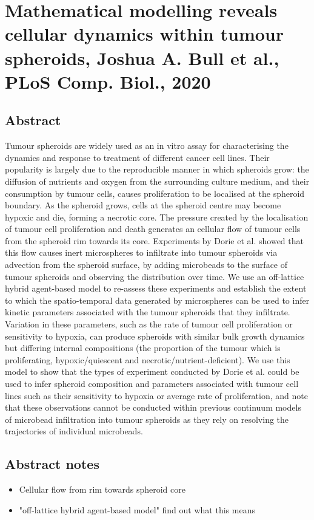 \documentclass[11pt,a4paper]{article}
\begin{document}
\section*{Mathematical modelling reveals cellular dynamics within tumour spheroids, Joshua A. Bull et al., \textbf{PLoS Comp. Biol.}, 2020}
\subsection*{Abstract}
Tumour spheroids are widely used as an in vitro assay for characterising the dynamics and response to treatment of different cancer cell lines. Their popularity is largely due to the reproducible manner in which spheroids grow: the diffusion of nutrients and oxygen from the surrounding culture medium, and their consumption by tumour cells, causes proliferation to be localised at the spheroid boundary. As the spheroid grows, cells at the spheroid centre may become hypoxic and die, forming a necrotic core. The pressure created by the localisation of tumour cell proliferation and death generates an cellular flow of tumour cells from the spheroid rim towards its core. Experiments by Dorie et al. showed that this flow causes inert microspheres to infiltrate into tumour spheroids via advection from the spheroid surface, by adding microbeads to the surface of tumour spheroids and observing the distribution over time. We use an off-lattice hybrid agent-based model to re-assess these experiments and establish the extent to which the spatio-temporal data generated by microspheres can be used to infer kinetic parameters associated with the tumour spheroids that they infiltrate. Variation in these parameters, such as the rate of tumour cell proliferation or sensitivity to hypoxia, can produce spheroids with similar bulk growth dynamics but differing internal compositions (the proportion of the tumour which is proliferating, hypoxic/quiescent and necrotic/nutrient-deficient). We use this model to show that the types of experiment conducted by Dorie et al. could be used to infer spheroid composition and parameters associated with tumour cell lines such as their sensitivity to hypoxia or average rate of proliferation, and note that these observations cannot be conducted within previous continuum models of microbead infiltration into tumour spheroids as they rely on resolving the trajectories of individual microbeads.

\subsection*{Abstract notes}
\begin{itemize}
\item Cellular flow from rim towards spheroid core 
\item "off-lattice hybrid agent-based model" find out what this means
\end{itemize}
\end{document}
